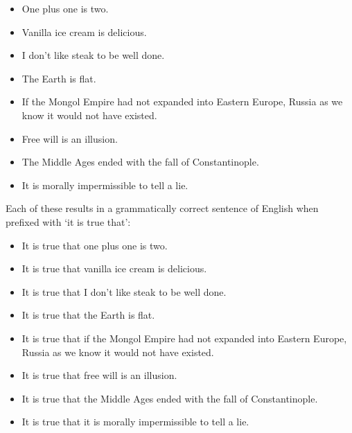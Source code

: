 \begin{itemize}

 \item One plus one is two.

 \item Vanilla ice cream is delicious.

 \item I don't like steak to be well done.

 \item The Earth is flat.

 \item If the Mongol Empire had not expanded into Eastern Europe, Russia as we 
  know it would not have existed.

 \item Free will is an illusion.

 \item The Middle Ages ended with the fall of Constantinople.

 \item It is morally impermissible to tell a lie.

\end{itemize}

Each of these results in a grammatically correct sentence of English when 
prefixed with `it is true that':

\begin{itemize}

 \item It is true that one plus one is two.

 \item It is true that vanilla ice cream is delicious.

 \item It is true that I don't like steak to be well done.

 \item It is true that the Earth is flat.

 \item It is true that if the Mongol Empire had not expanded into Eastern Europe, 
  Russia as we know it would not have existed.

 \item It is true that free will is an illusion.

 \item It is true that the Middle Ages ended with the fall of Constantinople.

 \item It is true that it is morally impermissible to tell a lie.

\end{itemize}

